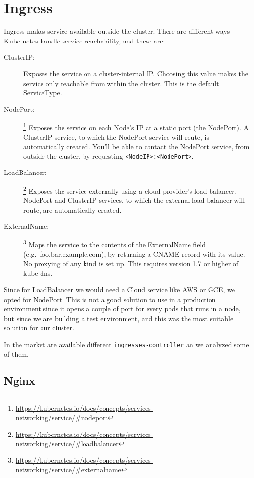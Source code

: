\section{Ingress}\label{ingress}

Ingress makes service available outside the cluster. There are different ways
Kubernetes handle service reachability, and these are:

\begin{description}
  \item [ClusterIP:] Exposes the service on a cluster-internal IP. Choosing this
  value makes the service only reachable from within the cluster. This
  is the default ServiceType.
  \item [NodePort:]
  \footnote{\url{https://kubernetes.io/docs/concepts/services-networking/service/\#nodeport}}
  Exposes the service on each Node's IP at a static port (the NodePort).
  A ClusterIP service, to which the NodePort service will route, is
  automatically created. You'll be able to contact the NodePort service,
  from outside the cluster, by requesting
  \texttt{\textless{}NodeIP\textgreater{}:\textless{}NodePort\textgreater{}}.
  \item [LoadBalancer:]
  \footnote{\url{https://kubernetes.io/docs/concepts/services-networking/service/\#loadbalancer}}
  Exposes the service externally using a cloud provider's load balancer.
  NodePort and ClusterIP services, to which the external load balancer
  will route, are automatically created.
  \item [ExternalName:]
  \footnote{\url{https://kubernetes.io/docs/concepts/services-networking/service/\#externalname}}
  Maps the service to the contents of the ExternalName field
  (e.g.~foo.bar.example.com), by returning a CNAME record with its
  value. No proxying of any kind is set up. This requires version 1.7 or
  higher of kube-dns.
\end{description}

Since for LoadBalancer we would need a Cloud service like AWS or GCE, we
opted for NodePort. This is not a good solution to use in
a production environment since it opens a couple of port for every pods
that runs in a node, but since we are building a test environment, and this
was the most suitable solution for our cluster.

In the market are available different \texttt{ingresses-controller} an we
analyzed some of them.
\subsection{Nginx}\label{nginx}

